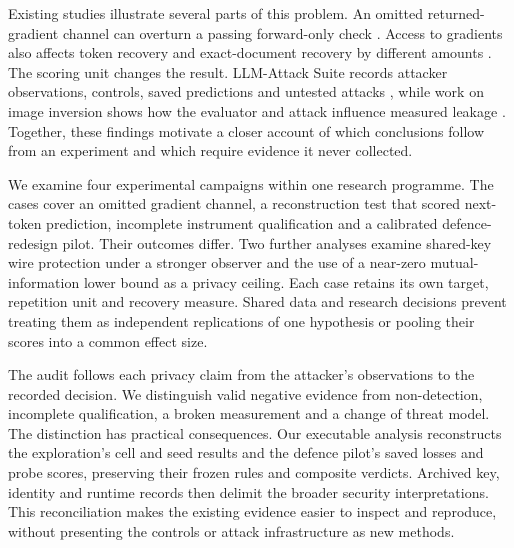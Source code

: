 \documentclass[11pt]{article}
\begin{document}
Existing studies illustrate several parts of this problem. An omitted
returned-gradient channel can overturn a passing forward-only check
\cite{paper1}. Access to gradients also affects token recovery and
exact-document recovery by different amounts \cite{gradients2026}.
The scoring unit changes the result. LLM-Attack Suite records attacker
observations, controls, saved predictions and untested attacks
\cite{suite2026}, while work on image inversion shows how the evaluator
and attack influence measured leakage \cite{mia2026}. Together, these
findings motivate a closer account of which conclusions follow from
an experiment and which require evidence it never collected.

We examine four experimental campaigns within one research programme.
The cases cover an omitted gradient channel, a reconstruction test that
scored next-token prediction, incomplete instrument qualification and a
calibrated defence-redesign pilot. Their outcomes differ. Two further
analyses examine shared-key wire protection under a stronger observer
and the use of a near-zero mutual-information lower bound as a privacy
ceiling. Each case retains its own target, repetition unit and recovery
measure. Shared data and research decisions prevent treating them as
independent replications of one hypothesis or pooling their scores into
a common effect size.

The audit follows each privacy claim from the attacker's observations to
the recorded decision. We distinguish valid negative evidence from
non-detection, incomplete qualification, a broken measurement and a
change of threat model. The distinction has practical consequences.
Our executable analysis reconstructs the exploration's cell and seed
results and the defence pilot's saved losses and probe scores, preserving
their frozen rules and composite verdicts. Archived key, identity and
runtime records then delimit the broader security interpretations.
This reconciliation makes the existing evidence easier to inspect and
reproduce, without presenting the controls or attack infrastructure as
new methods.






\appendix

\FloatBarrier


\end{document}
